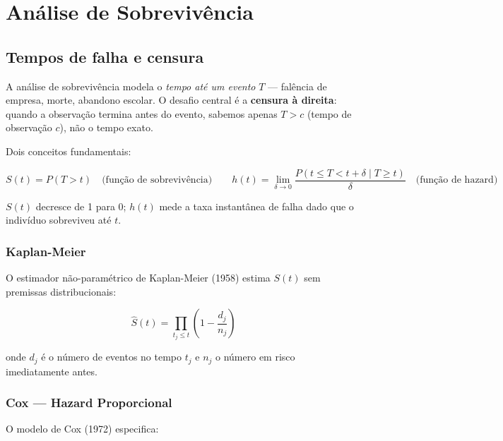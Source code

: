 \chapter{Análise de Sobrevivência}
\label{cap:sobrevivencia}

\section{Tempos de falha e censura}

A análise de sobrevivência modela o \emph{tempo até um evento} $T$ —
falência de empresa, morte, abandono escolar. O desafio central é a
\textbf{censura à direita}: quando a observação termina antes do evento,
sabemos apenas $T > c$ (tempo de observação $c$), não o tempo exato.

Dois conceitos fundamentais:

\[
  S(t) = P(T > t)
  \quad\text{(função de sobrevivência)}
  \qquad
  h(t) = \lim_{\delta\to 0} \frac{P(t \leq T < t+\delta \mid T \geq t)}{\delta}
  \quad\text{(função de hazard)}
\]

$S(t)$ decresce de 1 para 0; $h(t)$ mede a taxa instantânea de falha dado
que o indivíduo sobreviveu até $t$.

\subsection*{Kaplan-Meier}

O estimador não-paramétrico de Kaplan-Meier (1958) estima $S(t)$ sem
premissas distribucionais:

\[
  \hat{S}(t) = \prod_{t_j \leq t} \left(1 - \frac{d_j}{n_j}\right)
\]

onde $d_j$ é o número de eventos no tempo $t_j$ e $n_j$ o número em risco
imediatamente antes.

\subsection*{Cox — Hazard Proporcional}

O modelo de Cox (1972) especifica:


